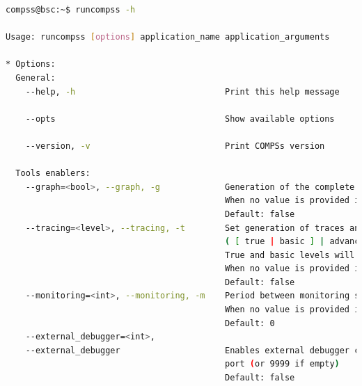 \begin{lstlisting}[language=bash]
compss@bsc:~$ runcompss -h

Usage: runcompss [options] application_name application_arguments

* Options:
  General:
    --help, -h                              Print this help message

    --opts                                  Show available options

    --version, -v                           Print COMPSs version
    
  Tools enablers:
    --graph=<bool>, --graph, -g             Generation of the complete graph (true/false)
                                            When no value is provided it is set to true
                                            Default: false
    --tracing=<level>, --tracing, -t        Set generation of traces and/or tracing level 
                                            ( [ true | basic ] | advanced | false)
                                            True and basic levels will produce the same traces.
                                            When no value is provided it is set to true
                                            Default: false
    --monitoring=<int>, --monitoring, -m    Period between monitoring samples (milliseconds)
                                            When no value is provided it is set to 2000
                                            Default: 0
    --external_debugger=<int>,
    --external_debugger                     Enables external debugger connection on the specified 
                                            port (or 9999 if empty)
                                            Default: false


\end{lstlisting}
